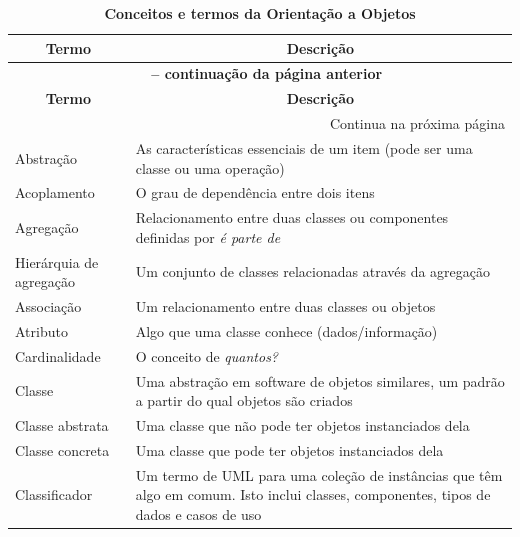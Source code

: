 \begin{longtable}[l]{p{4.6cm}p{11.1cm}}
\caption[Conceitos OO]{\bfseries Conceitos e termos da Orientação a Objetos}
\label{tab:concOO}\\

\multicolumn{1}{c}{\textbf{Termo}} & \multicolumn{1}{c}{\textbf{Descrição}} \\
\midrule
\endfirsthead

\multicolumn{2}{c}{{\bfseries \tablename\ \thetable{} -- continuação da página anterior}} \\
\multicolumn{1}{c}{\textbf{Termo}} & \multicolumn{1}{c}{\textbf{Descrição}} \\
\midrule
\endhead

\multicolumn{2}{r}{{Continua na próxima página}} \\%
\endfoot

\hline %

\endlastfoot

Abstração & As características essenciais de um item (pode ser uma classe ou uma operação) \\

Acoplamento & O grau de dependência entre dois itens\\

Agregação & Relacionamento entre duas classes ou componentes definidas por \emph{é parte de}\\

Hierárquia de agregação & Um conjunto de classes relacionadas através da agregação\\

Associação & Um relacionamento entre duas classes ou objetos\\

Atributo & Algo que uma classe conhece (dados/informação)\\

Cardinalidade & O conceito de \emph{quantos?}\\

Classe & Uma abstração em software de objetos similares, um padrão a partir do qual objetos são criados\\

Classe abstrata & Uma classe que não pode ter objetos instanciados dela \\

Classe concreta & Uma classe que pode ter objetos instanciados dela\\

Classificador & Um termo de UML para uma coleção de instâncias que têm algo em comum. Isto inclui classes, componentes, tipos de dados e casos de uso\\


\end{longtable}
